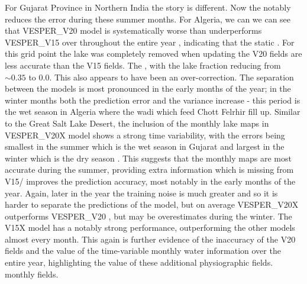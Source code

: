 \documentclass[hess, twostagejnl]{copernicus}
\providecommand{\DIFadd}[1]{{\protect\color{blue} \sf #1}} %
\providecommand{\DIFdel}[1]{{\protect\color{red} \scriptsize #1}} %
\providecommand{\DIFaddbegin}{} %
\providecommand{\DIFaddend}{} %
\providecommand{\DIFdelbegin}{} %
\providecommand{\DIFdelend}{} %
\begin{document}
\DIFdel{For Gujarat Province in Northern India the story is different. Now the }\DIFdelend \DIFaddbegin \DIFadd{notably reduces the error during these summer months. For Algeria, we can we can see that VESPER\_}\DIFaddend V20 \DIFdelbegin \DIFdel{model is systematically worse than }\DIFdelend \DIFaddbegin \DIFadd{underperforms VESPER\_}\DIFaddend V15 \DIFdelbegin \DIFdel{over }\DIFdelend \DIFaddbegin \DIFadd{throughout }\DIFaddend the entire year\DIFdelbegin \DIFdel{, indicating that the static }\DIFdelend \DIFaddbegin \DIFadd{. For this grid point the lake was completely removed when updating the }\DIFaddend V20 fields\DIFdelbegin \DIFdel{are less accurate than the V15 fields. The }\DIFdelend \DIFaddbegin \DIFadd{, with the lake fraction reducing from $\sim 0.35$ to 0.0. This also appears to have been an over-correction. The separation between the models is most pronounced in the early months of the year; in the winter months both the prediction error and the variance increase - this period is the wet season in Algeria where the wadi which feed Chott Felrhir fill up. Similar to the Great Salt Lake Desert, the inclusion of the monthly lake maps in VESPER\_}\DIFaddend V20X \DIFdelbegin \DIFdel{model shows a strong time variability, with the errors being smallest in the summer which is the wet season in Gujarat and largest in the winter which is the dry season . This suggests that the monthly maps are most accurate during the summer, providing extra information which is missing from V15/}\DIFdelend \DIFaddbegin \DIFadd{improves the prediction accuracy, most notably in the early months of the year. Again, later in the year the training noise is much greater and so it is harder to separate the predictions of the model, but on average VESPER\_V20X outperforms VESPER\_}\DIFaddend V20 \DIFdelbegin \DIFdel{, but may be overestimates during the winter. The V15X model has a notably strong performance, outperforming the other models almost every month. This again is further evidence of the inaccuracy of the V20 fields and the value of the time-variable monthly water information}\DIFdelend \DIFaddbegin \DIFadd{over the entire year, highlighting the value of these additional physiographic fields. monthly fields}\DIFaddend . 
\end{document}
